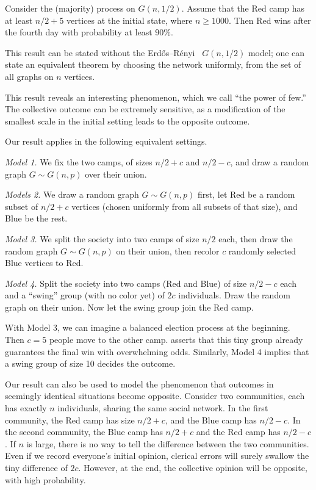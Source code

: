 \documentclass{toc}
\newcommand{\err}{Erd\H{o}s--R{\'e}nyi}
\begin{document}
			
			\begin{theorem}   \label{thm:const-advantage-ex}
				Consider the  (majority) process on $G(n, 1/2)$. Assume that the Red camp has at least  $n/2 + 5$  vertices at the initial state, where $n \ge 1000$. Then  Red wins after the fourth day with probability at least  $90\%$.
			\end{theorem}
			
			This result can be stated without the
			\err\  %
			$G(n, 1/2)$ %
			model; one can state an equivalent theorem by choosing the network uniformly, from the set of all graphs on $n$ vertices.
			
			This  result reveals an interesting phenomenon, which we call 
			``the power of few.''
			The collective outcome can be extremely sensitive, as a  modification of the smallest scale  in the initial setting leads to
			the opposite outcome.
			
			Our result applies in the following equivalent settings.
			
			\emph{Model 1.} We fix the two camps, of %
			sizes  %
			$n/2 +c$ and $n/2-c$,
			and draw a random graph $G\sim G(n, p)$ over their union.
			
			\emph{Models 2.} We draw a random graph $G \sim G(n, p)$ first, let Red be a random subset of $n/2 +c$ vertices (chosen uniformly from all subsets of that size), and Blue be the rest.
			
			\emph{Model 3.} We split the society into two camps of size $n/2$ each, then draw the random graph $G\sim G(n, p)$ on their union, then recolor $c$
			randomly selected  %
			Blue vertices to Red.
			
			\emph{Model 4.} Split the society into two camps (Red and Blue) of size $n/2-c$ each and a ``swing'' group (with no color yet) of $2c$ individuals. Draw the random graph on their union. Now let the swing group join the Red camp.
			
			With Model 3, we can imagine a balanced election process at the beginning. Then $c = 5$ people move to the other camp.  asserts that this tiny group already %
			guarantees  %
			the final win with %
			overwhelming odds. Similarly, Model 4 implies that a swing group of size 10 decides the outcome.
			
			Our result can also be used to model the phenomenon that outcomes  in seemingly identical
			situations become opposite. Consider two communities, each has exactly $n$ individuals, sharing the same social network. In the first community,
			the  %
			Red camp  has
			size $n/2 +c$, and
			the  %
			Blue camp has $n/2-c$. In the second community,
			the  %
			Blue camp has $n/2+c$ and
			the  %
			Red camp has $n/2-c$. If $n$ is large,
			there is no way to tell the difference between the two communities.
			Even if we record everyone's initial opinion,  clerical errors will surely swallow the tiny difference
			of $2c$.  However, at the end, the collective opinion  will be opposite, with high probability.
			
\end{document}
